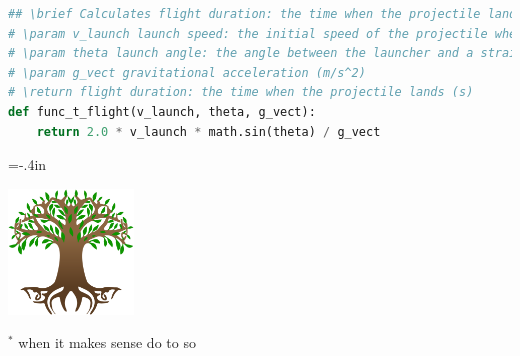 \documentclass[usenames,dvipsnames,10pt]{beamer}
\begin{document}
\begin{frame}[fragile]
\begin{lstlisting}[language=Python,basicstyle=\ttfamily\tiny,
  keywordstyle=bfseries,breaklines=false]
## \brief Calculates flight duration: the time when the projectile lands (s)
# \param v_launch launch speed: the initial speed of the projectile when launched (m/s)
# \param theta launch angle: the angle between the launcher and a straight line from the launcher to the target (rad)
# \param g_vect gravitational acceleration (m/s^2)
# \return flight duration: the time when the projectile lands (s)
def func_t_flight(v_launch, theta, g_vect):
    return 2.0 * v_launch * math.sin(theta) / g_vect

\end{lstlisting}
\end{frame}
  
\hoffset=-.4in %
\begin{frame}[plain]

\vspace*{8mm}

\begin{center}
\end{center}

\hspace*{1cm}\includegraphics[width=0.25\textwidth]{Icon.png}

\vspace*{2cm}
{\scriptsize $^{*}$ when it makes sense do to so}
\end{frame}
\hoffset=0in %
\end{document}
